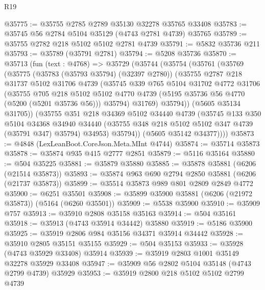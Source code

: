 \begin{lexlean}{R19}
\begin{coremodule}
{{{{{{{{{{{@35775 := @35755 @2785 @2789 @35130 @32278 @35765 @33408
@35783 := @35745 @56 @2784 @5104 @35129 (@4743 @2781 @4739) @35765
@35789 := @35755 @2782 @218 @5102 @5102 @2781 @4739
@35791 := @5832 @35736 @211
@35793 := @35789 (@35791 @2781)
@35794 := @5208 @35736
@35870 := @35713
    (fun (text : @4768) =>
    @35729
      (@35744
        (@35754
          (@35761
            (@35769
              (@35775
                (@35783 (@35793 @35794) (@32397 @2780))
                (@35755
                  @2787
                  @218
                  @31737
                  @5102
                  @31706
                  @4739
                  (@35745
                    @339
                    @765
                    @5104
                    @31702
                    @4772
                    @31706
                    (@35755
                      @705
                      @218
                      @5102
                      @5102
                      @4770
                      @4739
                      (@5195 @35736 @56 @4770 (@5200 (@5201 @35736 @56)))
                      @35794)
                    @31769)
                  @35794))
              (@5605 @35134 @31705))
            (@35755
              @351
              @218
              @34369
              @5102
              @34440
              @4739
              (@35745
                @133
                @350
                @5104
                @34368
                @34940
                @34440
                (@35755 @348 @218 @5102 @5102 @347 @4739 (@35791 @347) @35794)
                @34953)
              @35794))
          (@5605 @35142 @34377))))
@35873 := @4848 (LexLeanBoot.CoreJson.Meta.MInt @4744)
@35874 := @35714 @35873
@35878 := @35874 @935 @415 @2777 @2851
@35879 := @5116 @35164
@35880 := @504 @35225
@35881 := @35879 @35880
@35885 := @35878 @35881 (@6206 (@21514 @35873))
@35893 := @35874 @963 @690 @2794 @2850 @35881 (@6206 (@21737 @35873))
@35899 := @35514 @35873 @989 @801 @2809 @2849 @4772
@35900 := @6251 @35501
@35908 := @35899 @35900 @35881 (@6206 (@21972 @35873)) (@5164 (@6260 @35501))
@35909 := @5538 @35900
@35910 := @35909 @757
@35913 := @35910 @2808 @35158 @35163
@35914 := @504 @35161
@35918 := @35913 (@4743 @35914 @34442) @35880
@35919 := @5186 @35900
@35925 := @35919 @2806 @984 @35156 @34371 @35914 @34442
@35928 := @35910 @2805 @35151 @35155
@35929 := @504 @35153
@35933 := @35928 (@4743 @35929 @33408) @35914
@35939 := @35919 @2803 @1001 @35149 @32278 @35929 @33408
@35947 := @35909 @56 @2802 @5104 @35148 (@4743 @2799 @4739) @35929
@35953 := @35919 @2800 @218 @5102 @5102 @2799 @4739
}}}}}}}}}}}
\end{coremodule}
\end{lexlean}
